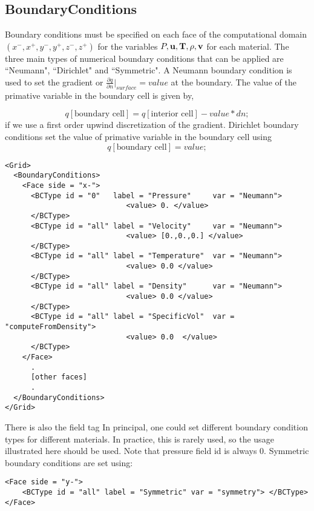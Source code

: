 \subsection{BoundaryConditions}
Boundary conditions must be specified on each face of the computational
domain $(x^-, x^+, y^-, y^+,z^-,z^+)$ for the variables $P, \bf{u},
T, \rho, v$ for each material.  The three main types of numerical
boundary conditions that can be applied are ``Neumann",  ``Dirichlet" and
``Symmetric".  A Neumann boundary condition is used to set the gradient
or $\frac{\partial{q}}{\partial{n}}|_{surface} = value$ at the boundary.
The value of the primative variable in the boundary cell is given by,

%
\begin{equation}
    q[\text{boundary cell}] = q[\text{interior cell}] - value * dn;
\end{equation}
%
if we use a first order upwind discretization of the gradient.  Dirichlet
boundary conditions set the value of primative variable in the boundary
cell using
%
\begin{equation}
    q[\text{boundary cell}] =  value;
\end{equation}
%
\begin{Verbatim}[fontsize=\footnotesize]
<Grid>
  <BoundaryConditions>
    <Face side = "x-">
      <BCType id = "0"   label = "Pressure"     var = "Neumann">
                            <value> 0. </value>
      </BCType>
      <BCType id = "all" label = "Velocity"     var = "Neumann">
                            <value> [0.,0.,0.] </value>
      </BCType>
      <BCType id = "all" label = "Temperature"  var = "Neumann">
                            <value> 0.0 </value>
      </BCType>
      <BCType id = "all" label = "Density"      var = "Neumann">
                            <value> 0.0 </value>
      </BCType>
      <BCType id = "all" label = "SpecificVol"  var = "computeFromDensity">
                            <value> 0.0  </value>
      </BCType>
    </Face>
      .
      [other faces]
      .
  </BoundaryConditions>
</Grid>
\end{Verbatim}
There is also the field tag   In principal, one could set
different boundary condition types for different materials.  In practice,
this is rarely used, so the usage illustrated here should be used.  Note that
pressure field id is always 0.  Symmetric boundary conditions are set using:
%
\begin{Verbatim}[fontsize=\footnotesize]
<Face side = "y-">
    <BCType id = "all" label = "Symmetric" var = "symmetry"> </BCType>
</Face>
\end{Verbatim}

